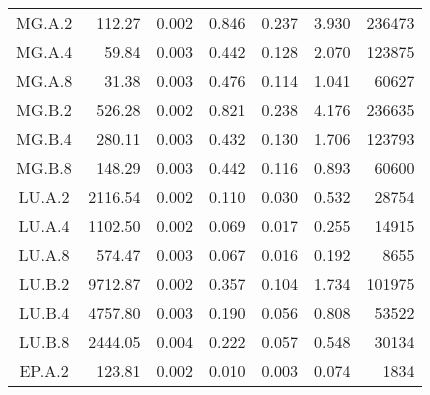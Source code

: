\begin{ThreePartTable}
\begin{longtable}[c]{c*{6}{r}}
        MG.A.2                 & 112.27                              & 0.002                               & 0.846          & 0.237 & 3.930 & 236473 \\
        MG.A.4                 & 59.84                               & 0.003                               & 0.442          & 0.128 & 2.070 & 123875 \\
        MG.A.8                 & 31.38                               & 0.003                               & 0.476          & 0.114 & 1.041 & 60627  \\
        MG.B.2                 & 526.28                              & 0.002                               & 0.821          & 0.238 & 4.176 & 236635 \\
        MG.B.4                 & 280.11                              & 0.003                               & 0.432          & 0.130 & 1.706 & 123793 \\
        MG.B.8                 & 148.29                              & 0.003                               & 0.442          & 0.116 & 0.893 & 60600  \\
        LU.A.2                 & 2116.54                             & 0.002                               & 0.110          & 0.030 & 0.532 & 28754  \\
        LU.A.4                 & 1102.50                             & 0.002                               & 0.069          & 0.017 & 0.255 & 14915  \\
        LU.A.8                 & 574.47                              & 0.003                               & 0.067          & 0.016 & 0.192 & 8655   \\
        LU.B.2                 & 9712.87                             & 0.002                               & 0.357          & 0.104 & 1.734 & 101975 \\
        LU.B.4                 & 4757.80                             & 0.003                               & 0.190          & 0.056 & 0.808 & 53522  \\
        LU.B.8                 & 2444.05                             & 0.004                               & 0.222          & 0.057 & 0.548 & 30134  \\
        EP.A.2                 & 123.81                              & 0.002                               & 0.010          & 0.003 & 0.074 & 1834   \\ \bottomrule
    \end{longtable}
\end{ThreePartTable}

